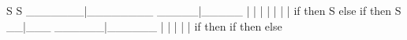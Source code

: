        S                 S
_______|________    _____|_____
|    |    |    |    |    |    |
if  then  S   else  if  then  S
        __|___          ______|______
        |    |          |     |     |
        if  then        if   then  else


